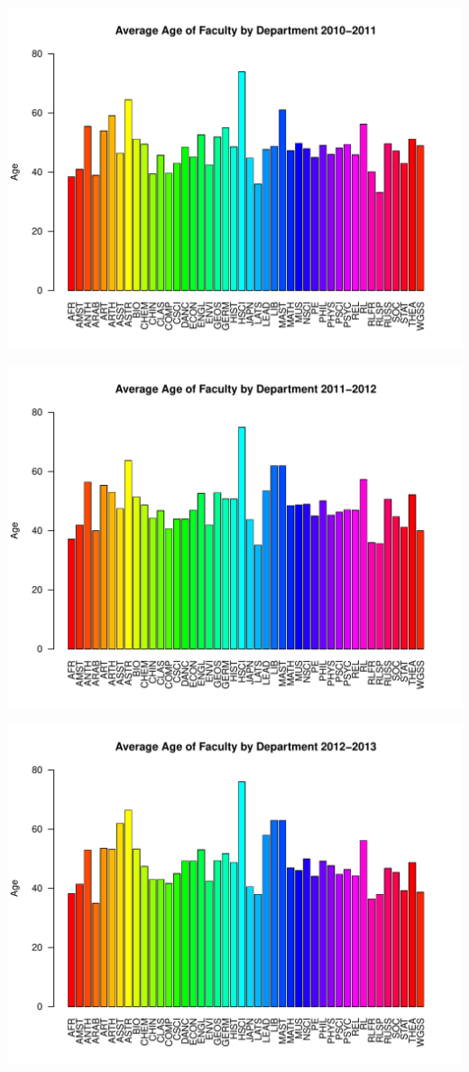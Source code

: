 \documentclass[12pt,a4paper]{article}\usepackage[]{graphicx}\usepackage[]{color}
\makeatletter
\def\maxwidth{ %
  \ifdim\Gin@nat@width>\linewidth
    \linewidth
  \else
    \Gin@nat@width
  \fi
}
\newenvironment{knitrout}{}{} %
\theoremstyle{definition}
\makeatother
\begin{document}
\begin{knitrout}
\includegraphics[width=\maxwidth]{figure/unnamed-chunk-10-7} 

\includegraphics[width=\maxwidth]{figure/unnamed-chunk-10-8} 

\includegraphics[width=\maxwidth]{figure/unnamed-chunk-10-9} 


\end{knitrout}
\end{document}
